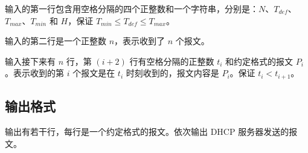 输入的第一行包含用空格分隔的四个正整数和一个字符串，分别是：$N$、$T_{def}$、$T_{max}$、$T_{min}$ 和 $H$，保证 $T_{min} \le T_{def} \le T_{max}$。

输入的第二行是一个正整数 $n$，表示收到了 $n$ 个报文。

输入接下来有 $n$ 行，第 $(i+2)$ 行有空格分隔的正整数 $t_i$ 和约定格式的报文 $P_i$。表示收到的第 $i$ 个报文是在 $t_i$ 时刻收到的，报文内容是 $P_i$。保证 $t_i < t_{i+1}$。


\subsection*{输出格式}

输出有若干行，每行是一个约定格式的报文。依次输出 DHCP 服务器发送的报文。


